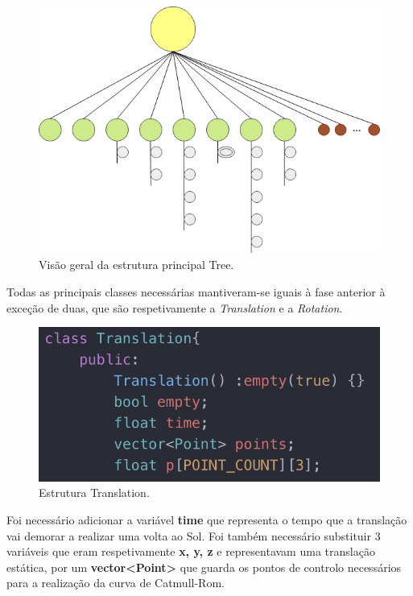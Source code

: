 \documentclass[a4paper]{article}
\begin{document}
\begin{figure}[H]
\centering
\includegraphics[scale=0.6]{tree_struct.png}
\caption{Visão geral da estrutura principal Tree.}
\label{img:tree_struct}
\end{figure}

Todas as principais classes necessárias mantiveram-se iguais à fase anterior à exceção de duas, que são respetivamente a \textit{Translation} e a \textit{Rotation}.

\begin{figure}[H]
\centering
\includegraphics[scale=0.75]{translation.png}
\caption{Estrutura Translation.}
\label{img:translation}
\end{figure}

Foi necessário adicionar a variável \textbf{time} que representa o tempo que a translação vai demorar a realizar uma volta ao Sol. Foi também necessário substituir 3 variáveis que eram respetivamente \textbf{x, y, z} e representavam uma translação estática, por um \textbf{vector<Point>} que guarda os pontos de controlo necessários para a realização da curva de Catmull-Rom.
\end{document}
